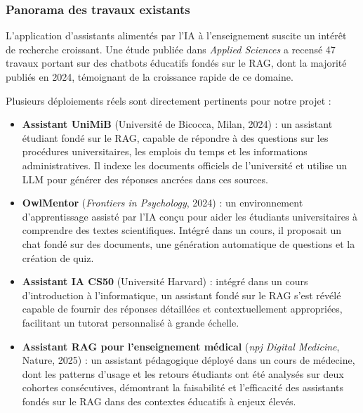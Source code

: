 \documentclass[a4paper,11pt]{article}
\begin{document}
\subsubsection{Panorama des travaux existants}

L'application d'assistants alimentés par l'IA à l'enseignement suscite un
intérêt de recherche croissant. Une étude publiée dans \emph{Applied Sciences}
\cite{mdpi2025rag} a recensé 47 travaux portant sur des chatbots éducatifs
fondés sur le RAG, dont la majorité publiés en 2024, témoignant de la
croissance rapide de ce domaine.

Plusieurs déploiements réels sont directement pertinents pour notre projet :

\begin{itemize}
  \item \textbf{Assistant UniMiB} (Université de Bicocca, Milan, 2024)
    \cite{unimib2024} : un assistant étudiant fondé sur le RAG, capable
    de répondre à des questions sur les procédures universitaires, les
    emplois du temps et les informations administratives. Il indexe les
    documents officiels de l'université et utilise un LLM pour générer
    des réponses ancrées dans ces sources.

  \item \textbf{OwlMentor} (\emph{Frontiers in Psychology}, 2024)
    \cite{owlmentor2024} : un environnement d'apprentissage assisté par
    l'IA conçu pour aider les étudiants universitaires à comprendre des
    textes scientifiques. Intégré dans un cours, il proposait un chat
    fondé sur des documents, une génération automatique de questions et
    la création de quiz.

  \item \textbf{Assistant IA CS50} (Université Harvard) : intégré dans
    un cours d'introduction à l'informatique, un assistant fondé sur le
    RAG s'est révélé capable de fournir des réponses détaillées et
    contextuellement appropriées, facilitant un tutorat personnalisé à
    grande échelle.

  \item \textbf{Assistant RAG pour l'enseignement médical} (\emph{npj
    Digital Medicine}, Nature, 2025) \cite{npj2025} : un assistant
    pédagogique déployé dans un cours de médecine, dont les patterns
    d'usage et les retours étudiants ont été analysés sur deux cohortes
    consécutives, démontrant la faisabilité et l'efficacité des assistants
    fondés sur le RAG dans des contextes éducatifs à enjeux élevés.
\end{itemize}
\end{document}
